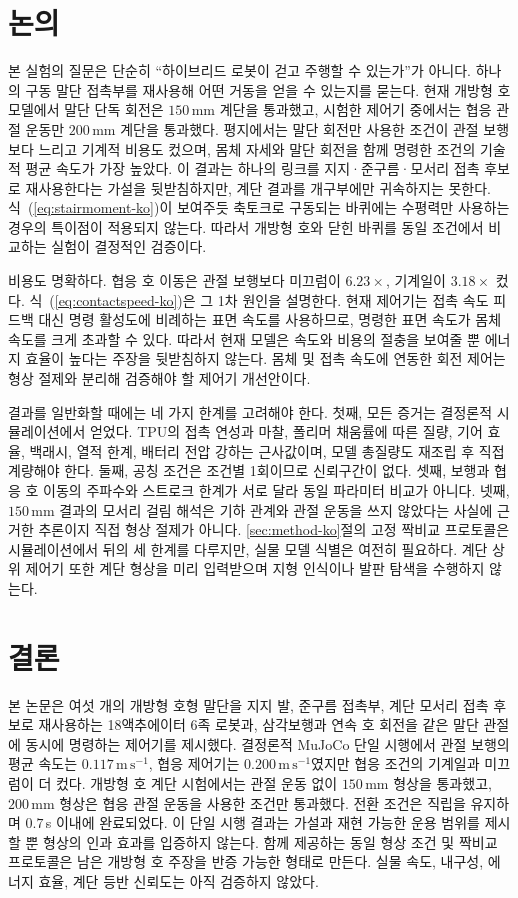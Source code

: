 \section{논의}

본 실험의 질문은 단순히 ``하이브리드 로봇이 걷고 주행할 수 있는가''가 아니다.
하나의 구동 말단 접촉부를 재사용해 어떤 거동을 얻을 수 있는지를 묻는다. 현재
개방형 호 모델에서 말단 단독 회전은 $150\,$mm 계단을 통과했고, 시험한 제어기
중에서는 협응 관절 운동만 $200\,$mm 계단을 통과했다. 평지에서는 말단 회전만
사용한 조건이 관절 보행보다 느리고 기계적 비용도 컸으며, 몸체 자세와 말단 회전을
함께 명령한 조건의 기술적 평균 속도가 가장 높았다. 이 결과는 하나의 링크를
지지·준구름·모서리 접촉 후보로 재사용한다는 가설을 뒷받침하지만, 계단 결과를
개구부에만 귀속하지는 못한다. 식~(\ref{eq:stairmoment-ko})이 보여주듯 축토크로
구동되는 바퀴에는 수평력만 사용하는 경우의 특이점이 적용되지 않는다. 따라서
개방형 호와 닫힌 바퀴를 동일 조건에서 비교하는 실험이 결정적인 검증이다.

비용도 명확하다. 협응 호 이동은 관절 보행보다 미끄럼이 $6.23\times$, 기계일이
$3.18\times$ 컸다. 식~(\ref{eq:contactspeed-ko})은 그 1차 원인을 설명한다.
현재 제어기는 접촉 속도 피드백 대신 명령 활성도에 비례하는 표면 속도를 사용하므로,
명령한 표면 속도가 몸체 속도를 크게 초과할 수 있다. 따라서 현재 모델은 속도와
비용의 절충을 보여줄 뿐 에너지 효율이 높다는 주장을 뒷받침하지 않는다. 몸체 및
접촉 속도에 연동한 회전 제어는 형상 절제와 분리해 검증해야 할 제어기 개선안이다.

결과를 일반화할 때에는 네 가지 한계를 고려해야 한다. 첫째, 모든 증거는 결정론적
시뮬레이션에서 얻었다. TPU의 접촉 연성과 마찰, 폴리머 채움률에 따른 질량, 기어
효율, 백래시, 열적 한계, 배터리 전압 강하는 근사값이며, 모델 총질량도 재조립 후
직접 계량해야 한다. 둘째, 공칭 조건은 조건별 1회이므로 신뢰구간이 없다. 셋째,
보행과 협응 호 이동의 주파수와 스트로크 한계가 서로 달라 동일 파라미터 비교가
아니다. 넷째, $150\,$mm 결과의 모서리 걸림 해석은 기하 관계와 관절 운동을 쓰지
않았다는 사실에 근거한 추론이지 직접 형상 절제가 아니다. \ref{sec:method-ko}절의
고정 짝비교 프로토콜은 시뮬레이션에서 뒤의 세 한계를 다루지만, 실물 모델 식별은
여전히 필요하다. 계단 상위 제어기 또한 계단 형상을 미리 입력받으며 지형 인식이나
발판 탐색을 수행하지 않는다.

\section{결론}

본 논문은 여섯 개의 개방형 호형 말단을 지지 발, 준구름 접촉부, 계단 모서리 접촉
후보로 재사용하는 18액추에이터 6족 로봇과, 삼각보행과 연속 호 회전을 같은 말단
관절에 동시에 명령하는 제어기를 제시했다. 결정론적 MuJoCo 단일 시행에서 관절
보행의 평균 속도는 $0.117\,\mathrm{m\,s^{-1}}$, 협응 제어기는
$0.200\,\mathrm{m\,s^{-1}}$였지만 협응 조건의 기계일과 미끄럼이 더 컸다.
개방형 호 계단 시험에서는 관절 운동 없이 $150\,$mm 형상을 통과했고, $200\,$mm
형상은 협응 관절 운동을 사용한 조건만 통과했다. 전환 조건은 직립을 유지하며
$0.7\,$s 이내에 완료되었다. 이 단일 시행 결과는 가설과 재현 가능한 운용 범위를
제시할 뿐 형상의 인과 효과를 입증하지 않는다. 함께 제공하는 동일 형상 조건 및
짝비교 프로토콜은 남은 개방형 호 주장을 반증 가능한 형태로 만든다. 실물 속도,
내구성, 에너지 효율, 계단 등반 신뢰도는 아직 검증하지 않았다.
